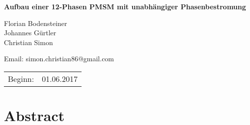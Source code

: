 \documentclass[12pt,paper=a4,fleqn,headsepline,headings=normal,cleardoublepage=current,titlepage,twoside,bibliography=totoc,listof=totoc,numbers=noenddot,parskip=half]{scrbook}  %
\newcommand{\doctitle}{Aufbau einer 12-Phasen PMSM mit unabhängiger Phasenbestromung}
\newcommand{\beginndatum}{01.06.2017}
\newcommand{\bearbeitername}{Florian Bodensteiner\\ Johannes Gürtler\\Christian Simon}
\begin{document}
\thispagestyle{empty}
\hypertarget{titelseite}{}


\vspace*{1cm}

\vfill

{
 \huge
\begin{center}
\textbf{\doctitle}
\end{center}


\vfill


\vfill

\begin{center}
\bearbeitername \\
\end{center}

\vfill

\begin{center}
Email: simon.christian86@gmail.com\\
\end{center}

\vfill

\begin{center}
\begin{tabular}{ll}
Beginn:& \beginndatum \\
\end{tabular}
\end{center}

\vfill
}
\cleardoubleemptypage

\cleardoubleemptypage


\thispagestyle{empty}
\setcounter{page}{3}
\hypertarget{erklaerung}{}%
%

\vfill

\cleardoubleemptypage


\chapter*{Abstract}

\vfill

\vfill
\cleardoubleemptypage
\end{document}
